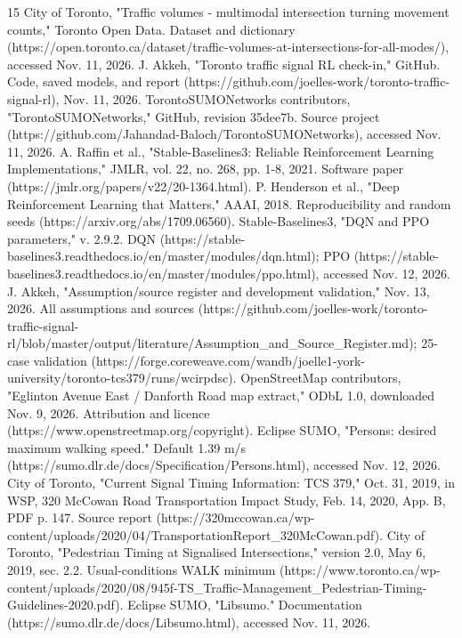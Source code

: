 \documentclass[conference]{IEEEtran}
\begin{document}
\begin{thebibliography}{15}
 City of Toronto, "Traffic volumes - multimodal intersection turning movement counts," Toronto Open Data. Dataset and dictionary (https://open.toronto.ca/dataset/traffic-volumes-at-intersections-for-all-modes/), accessed Nov. 11, 2026.
 J. Akkeh, "Toronto traffic signal RL check-in," GitHub. Code, saved models, and report (https://github.com/joelles-work/toronto-traffic-signal-rl), Nov. 11, 2026.
 TorontoSUMONetworks contributors, "TorontoSUMONetworks," GitHub, revision 35dee7b. Source project (https://github.com/Jahandad-Baloch/TorontoSUMONetworks), accessed Nov. 11, 2026.
 A. Raffin et al., "Stable-Baselines3: Reliable Reinforcement Learning Implementations," JMLR, vol. 22, no. 268, pp. 1-8, 2021. Software paper (https://jmlr.org/papers/v22/20-1364.html).
 P. Henderson et al., "Deep Reinforcement Learning that Matters," AAAI, 2018. Reproducibility and random seeds (https://arxiv.org/abs/1709.06560).
 Stable-Baselines3, "DQN and PPO parameters," v. 2.9.2. DQN (https://stable-baselines3.readthedocs.io/en/master/modules/dqn.html); PPO (https://stable-baselines3.readthedocs.io/en/master/modules/ppo.html), accessed Nov. 12, 2026.
 J. Akkeh, "Assumption/source register and development validation," Nov. 13, 2026. All assumptions and sources (https://github.com/joelles-work/toronto-traffic-signal-rl/blob/master/output/literature/Assumption\_and\_Source\_Register.md); 25-case validation (https://forge.coreweave.com/wandb/joelle1-york-university/toronto-tcs379/runs/wcirpdsc).
 OpenStreetMap contributors, "Eglinton Avenue East / Danforth Road map extract," ODbL 1.0, downloaded Nov. 9, 2026. Attribution and licence (https://www.openstreetmap.org/copyright).
 Eclipse SUMO, "Persons: desired maximum walking speed." Default 1.39 m/s (https://sumo.dlr.de/docs/Specification/Persons.html), accessed Nov. 12, 2026.
 City of Toronto, "Current Signal Timing Information: TCS 379," Oct. 31, 2019, in WSP, 320 McCowan Road Transportation Impact Study, Feb. 14, 2020, App. B, PDF p. 147. Source report (https://320mccowan.ca/wp-content/uploads/2020/04/TransportationReport\_320McCowan.pdf).
 City of Toronto, "Pedestrian Timing at Signalised Intersections," version 2.0, May 6, 2019, sec. 2.2. Usual-conditions WALK minimum (https://www.toronto.ca/wp-content/uploads/2020/08/945f-TS\_Traffic-Management\_Pedestrian-Timing-Guidelines-2020.pdf).
 Eclipse SUMO, "Libsumo." Documentation (https://sumo.dlr.de/docs/Libsumo.html), accessed Nov. 11, 2026.

\end{thebibliography}
\end{document}
